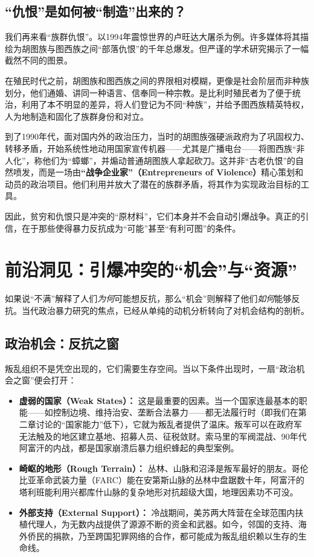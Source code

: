 \documentclass[a5paper, 11pt, openany]{ctexbook}
\begin{document}
\subsection{“仇恨”是如何被“制造”出来的？}

我们再来看“族群仇恨”。以1994年震惊世界的卢旺达大屠杀为例。许多媒体将其描绘为胡图族与图西族之间“部落仇恨”的千年总爆发。但严谨的学术研究揭示了一幅截然不同的图景。

在殖民时代之前，胡图族和图西族之间的界限相对模糊，更像是社会阶层而非种族划分，他们通婚、讲同一种语言、信奉同一种宗教。是比利时殖民者为了便于统治，利用了本不明显的差异，将人们登记为不同“种族”，并给予图西族精英特权，人为地制造和固化了族群身份和对立。

到了1990年代，面对国内外的政治压力，当时的胡图族强硬派政府为了巩固权力、转移矛盾，开始系统性地动用国家宣传机器——尤其是广播电台——将图西族“非人化”，称他们为“蟑螂”，并煽动普通胡图族人拿起砍刀。这并非“古老仇恨”的自然喷发，而是一场由\textbf{“战争企业家”（Entrepreneurs of Violence）}精心策划和动员的政治项目。他们利用并放大了潜在的族群矛盾，将其作为实现政治目标的工具。

因此，贫穷和仇恨只是冲突的“原材料”，它们本身并不会自动引爆战争。真正的引信，在于那些使得暴力反抗成为“可能”甚至“有利可图”的条件。

\section{前沿洞见：引爆冲突的“机会”与“资源”}

如果说“不满”解释了人们\textit{为何}可能想反抗，那么“机会”则解释了他们\textit{如何}能够反抗。当代政治暴力研究的焦点，已经从单纯的动机分析转向了对机会结构的剖析。

\subsection{政治机会：反抗之窗}

叛乱组织不是凭空出现的，它们需要生存空间。当以下条件出现时，一扇“政治机会之窗”便会打开：
\begin{itemize}
    \item \textbf{虚弱的国家（Weak States）：} 这是最重要的因素。当一个国家连最基本的职能——如控制边境、维持治安、垄断合法暴力——都无法履行时（即我们在第二章讨论的“国家能力”低下），它就为叛乱者提供了温床。叛军可以在政府军无法触及的地区建立基地、招募人员、征税敛财。索马里的军阀混战、90年代阿富汗的内战，都是国家崩溃后暴力组织蜂起的典型案例。
    \item \textbf{崎岖的地形（Rough Terrain）：} 丛林、山脉和沼泽是叛军最好的朋友。哥伦比亚革命武装力量（FARC）能在安第斯山脉的丛林中盘踞数十年，阿富汗的塔利班能利用兴都库什山脉的复杂地形对抗超级大国，地理因素功不可没。
    \item \textbf{外部支持（External Support）：} 冷战期间，美苏两大阵营在全球范围内扶植代理人，为无数内战提供了源源不断的资金和武器。如今，邻国的支持、海外侨民的捐款，乃至跨国犯罪网络的合作，都可能成为叛乱组织赖以生存的生命线。
\end{itemize}
\end{document}
